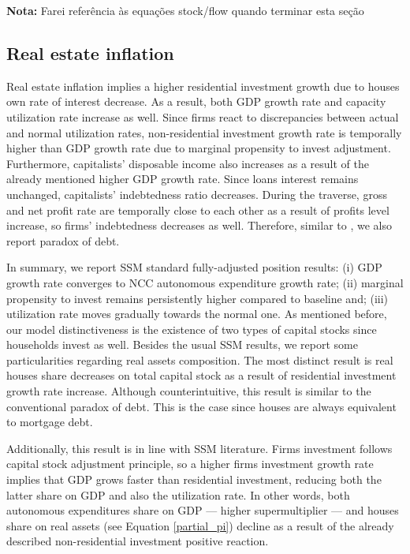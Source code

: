 \documentclass[11pt]{article}
\begin{document}
\textbf{Nota:} Farei referência às equações stock/flow quando terminar esta seção

\subsection{Real estate inflation}
\label{sec:org9b226d0}
\label{sec:Exp2}


Real estate inflation implies a higher residential investment growth due to houses own rate of interest decrease.
As a result, both GDP growth rate and capacity utilization rate increase as well.
Since firms react to discrepancies between actual and normal utilization rates, non-residential investment growth rate 
is temporally higher than GDP growth rate due to marginal propensity to invest adjustment.
Furthermore, capitalists' disposable income also increases as a result of the already mentioned higher GDP growth rate.
Since loans interest remains unchanged, capitalists' indebtedness ratio decreases.
During the traverse, gross and net profit rate are temporally close to each other as a result of profits level increase, so firms' indebtedness decreases as well.
Therefore, similar to \textcite{mandarino-2020-worker-debt}, we also report paradox of debt.

In summary, we report SSM standard fully-adjusted position results:
    (i) GDP growth rate converges to NCC autonomous expenditure growth rate;
    (ii) marginal propensity to invest remains persistently higher compared to baseline and;
    (iii) utilization rate moves gradually towards the normal one.
As mentioned before, our model distinctiveness is the existence of two types of capital stocks since households invest as well.
Besides the usual SSM results, we report some particularities regarding real assets composition.
The most distinct result is real houses share decreases on total capital stock as a result of residential investment growth rate increase.
Although counterintuitive, this result is similar to the conventional paradox of debt.
This is the case since houses are always equivalent to  mortgage debt.


Additionally, this result is in line with SSM literature.
Firms investment follows capital stock adjustment principle, so a higher firms investment growth rate implies that
GDP grows faster than residential investment, reducing both the latter share on GDP and
also the utilization rate.
In other words, both autonomous expenditures share on GDP --- higher supermultiplier --- and houses share on real assets (see Equation \ref{partial_pi}) decline as a result of the already described non-residential investment positive reaction.
\end{document}
